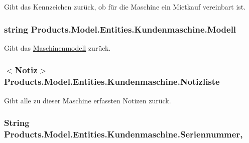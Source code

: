 Gibt das Kennzeichen zurück, ob für die Maschine ein Mietkauf vereinbart ist. 

\subsubsection[{\texorpdfstring{Modell}{Modell}}]{\setlength{\rightskip}{0pt plus 5cm}string Products.\+Model.\+Entities.\+Kundenmaschine.\+Modell\hspace{0.3cm}{\ttfamily [get]}}\hypertarget{class_products_1_1_model_1_1_entities_1_1_kundenmaschine_a7cf4c899e2149dfb7ac4838fc16578c6}{}\label{class_products_1_1_model_1_1_entities_1_1_kundenmaschine_a7cf4c899e2149dfb7ac4838fc16578c6}


Gibt das \hyperlink{class_products_1_1_model_1_1_entities_1_1_maschinenmodell}{Maschinenmodell} zurück. 

\subsubsection[{\texorpdfstring{Notizliste}{Notizliste}}]{$<${\bf Notiz}$>$ Products.\+Model.\+Entities.\+Kundenmaschine.\+Notizliste\hspace{0.3cm}{\ttfamily [get]}}\hypertarget{class_products_1_1_model_1_1_entities_1_1_kundenmaschine_ab696f2318c6dbedac87c870dd764365b}{}\label{class_products_1_1_model_1_1_entities_1_1_kundenmaschine_ab696f2318c6dbedac87c870dd764365b}


Gibt alle zu dieser Maschine erfassten Notizen zurück. 

\subsubsection[{\texorpdfstring{Seriennummer}{Seriennummer}}]{\setlength{\rightskip}{0pt plus 5cm}String Products.\+Model.\+Entities.\+Kundenmaschine.\+Seriennummer\hspace{0.3cm}{\ttfamily [get]}, {\ttfamily [set]}}\hypertarget{class_products_1_1_model_1_1_entities_1_1_kundenmaschine_a854408dc19b52b68a1c6b824761d5672}{}\label{class_products_1_1_model_1_1_entities_1_1_kundenmaschine_a854408dc19b52b68a1c6b824761d5672}


